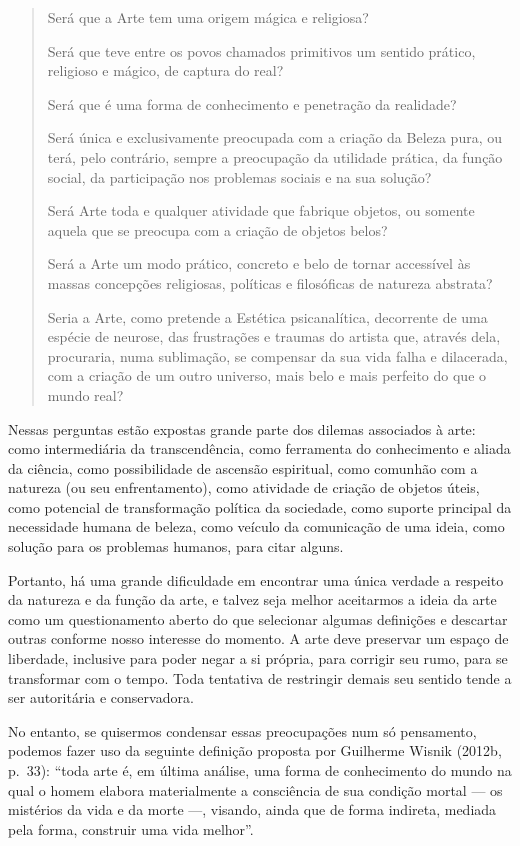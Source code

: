 \begin{quote}
Será que a Arte tem uma origem mágica e religiosa?

Será que teve entre os povos chamados primitivos um sentido prático,
religioso e mágico, de captura do real?

Será que é uma forma de conhecimento e penetração da realidade?

Será única e exclusivamente preocupada com a criação da Beleza pura, ou
terá, pelo contrário, sempre a preocupação da utilidade prática, da
função social, da participação nos problemas sociais e na sua solução?

Será Arte toda e qualquer atividade que fabrique objetos, ou somente
aquela que se preocupa com a criação de objetos belos?

Será a Arte um modo prático, concreto e belo de tornar accessível às
massas concepções religiosas, políticas e filosóficas de natureza
abstrata?

Seria a Arte, como pretende a Estética psicanalítica, decorrente de uma
espécie de neurose, das frustrações e traumas do artista que, através
dela, procuraria, numa sublimação, se compensar da sua vida falha e
dilacerada, com a criação de um outro universo, mais belo e mais
perfeito do que o mundo real?
\end{quote}

Nessas perguntas estão expostas grande parte dos dilemas associados à
arte: como intermediária da transcendência, como ferramenta do
conhecimento e aliada da ciência, como possibilidade de ascensão
espiritual, como comunhão com a natureza (ou seu enfrentamento), como
atividade de criação de objetos úteis, como potencial de transformação
política da sociedade, como suporte principal da necessidade humana de
beleza, como veículo da comunicação de uma ideia, como solução para os
problemas humanos, para citar alguns.

Portanto, há uma grande dificuldade em encontrar uma única verdade a
respeito da natureza e da função da arte, e talvez seja melhor
aceitarmos a ideia da arte como um questionamento aberto do que
selecionar algumas definições e descartar outras conforme nosso
interesse do momento. A arte deve preservar um espaço de liberdade,
inclusive para poder negar a si própria, para corrigir seu rumo, para se
transformar com o tempo. Toda tentativa de restringir demais seu sentido
tende a ser autoritária e conservadora.

No entanto, se quisermos condensar essas preocupações num só pensamento,
podemos fazer uso da seguinte definição proposta por Guilherme Wisnik
(2012b, p.~33): ``toda arte é, em última análise, uma forma de
conhecimento do mundo na qual o homem elabora materialmente a
consciência de sua condição mortal --- os mistérios da vida e da morte
---, visando, ainda que de forma indireta, mediada pela forma, construir
uma vida melhor''.


